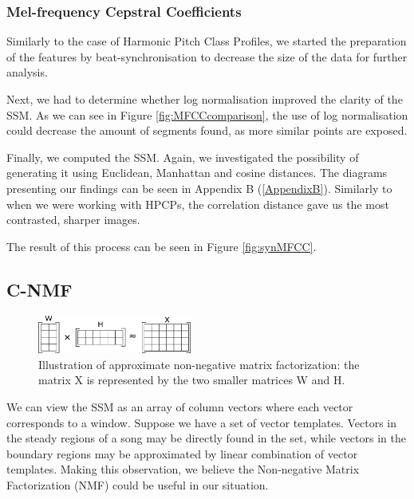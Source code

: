 \subsubsection*{Mel-frequency Cepstral Coefficients}


Similarly to the case of Harmonic Pitch Class Profiles, we started the preparation of the features by beat-synchronisation to decrease the size of the data for further analysis. 

Next, we had to determine whether log normalisation improved the clarity of the SSM. As we can see in Figure \ref{fig:MFCCcomparison}, the use of log normalisation could decrease the amount of segments found, as more similar points are exposed.

Finally, we computed the SSM. Again, we investigated the possibility of generating it using Euclidean, Manhattan and cosine distances. The diagrams presenting our findings can be seen in Appendix B (\ref{AppendixB}). Similarly to when we were working with HPCPs, the correlation distance gave us the most contrasted, sharper images. 

The result of this process can be seen in Figure \ref{fig:synMFCC}.

\vspace{10pt}

\subsection{C-NMF}


\begin{figure}
\vspace{-20pt}
  \begin{center}
    \includegraphics[width=0.45\textwidth]{Figures/NMF}
  \end{center}
  \caption{Illustration of approximate non-negative matrix factorization: the matrix X is represented by the two smaller matrices W and H.}
\label{fig:NMF}
\end{figure}

We can view the SSM as an array of column vectors where each vector corresponds to a window. Suppose we have a set of vector templates. Vectors in the steady regions of a song may be directly found in the set, while vectors in the boundary regions may be approximated by linear combination of vector templates. Making this observation, we believe the Non-negative Matrix Factorization (NMF) could be useful in our situation.

